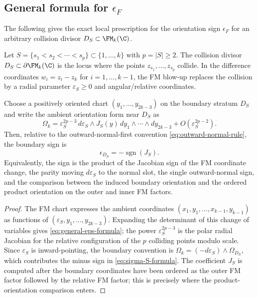 \subsection{\texorpdfstring{General formula for $\epsilon_F$}{General formula for epsilon F}}
\label{subsec:general-eps}

The following gives the exact local prescription for the orientation sign
$\epsilon_F$ for an arbitrary collision divisor
$D_S \subset \FM_k(\C)$.

\begin{proposition}
\label{prop:general-orient-sign}
Let $S = \{s_1 < s_2 < \cdots < s_p\} \subset \{1,\ldots,k\}$ with $p = |S| \ge 2$. The collision divisor $D_S \subset \partial\FM_k(\C)$ is the locus where the points $z_{s_1},\ldots,z_{s_p}$ collide. In the difference coordinates $w_i = z_i - z_k$ for $i = 1,\ldots,k-1$, the FM blow-up replaces the collision by a radial parameter $\varepsilon_S \ge 0$ and angular/relative coordinates.

Choose a positively oriented chart
$(y_1,\ldots,y_{2k-3})$ on the boundary stratum $D_S$ and write the
ambient orientation form near $D_S$ as
\begin{equation}
\label{eq:general-eps-formula}
\Omega_k
=
\varepsilon_S^{2p-3}\,
d\varepsilon_S\wedge
J_S(y)\,dy_1\wedge\cdots\wedge dy_{2k-3}
+O(\varepsilon_S^{2p-2}).
\end{equation}
Then, relative to the outward-normal-first convention
\eqref{eq:outward-normal-rule}, the boundary sign is
\begin{equation}
\label{eq:sigma-S-formula}
\epsilon_{D_S}=-\operatorname{sgn}(J_S).
\end{equation}
Equivalently, the sign is the product of the Jacobian sign of the FM
coordinate change, the parity moving \(d\varepsilon_S\) to the normal
slot, the single outward-normal sign, and the comparison between the
induced boundary orientation and the ordered product orientation on the
outer and inner FM factors.
\end{proposition}

\begin{proof}
The FM chart expresses the ambient coordinates
$(x_1,y_1,\ldots,x_{k-1},y_{k-1})$ as functions of
$(\varepsilon_S,y_1,\ldots,y_{2k-3})$. Expanding the determinant of this
change of variables gives \eqref{eq:general-eps-formula}; the power
$\varepsilon_S^{2p-3}$ is the polar radial Jacobian for the relative
configuration of the $p$ colliding points modulo scale. Since
$\varepsilon_S$ is inward-pointing, the boundary convention is
$\Omega_k=(-d\varepsilon_S)\wedge\Omega_{D_S}$, which contributes the
minus sign in \eqref{eq:sigma-S-formula}. The coefficient \(J_S\)
is computed after the boundary coordinates have been ordered as the
outer FM factor followed by the relative FM factor; this is precisely
where the product-orientation comparison enters.
\end{proof}

